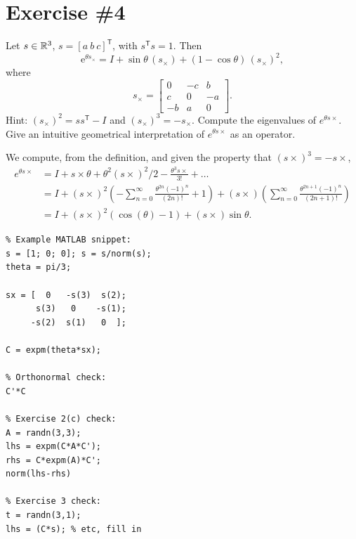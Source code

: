 \documentclass[11pt]{article}
\newcommand{\T}{\mathsf{T}}
\newcommand{\e}{\mathrm{e}}
\begin{document}
\section{Exercise \#4}
Let $s\in\mathbb{R}^3$, $s=[a\ b\ c]^\T$, with $s^\T s = 1$. Then
\[
\e^{\theta s_\times} = I + \sin\theta\,(s_\times) + (1-\cos\theta)\,(s_\times)^2,
\]
where
\[
s_\times =
\begin{bmatrix}
0 & -c & b\\
c & 0 & -a\\
-b & a & 0
\end{bmatrix}.
\]
Hint: $(s_\times)^2 = ss^\T - I$ and $(s_\times)^3 = -s_\times$.
Compute the eigenvalues of $e^{\theta s\times}$.
Give an intuitive geometrical interpretation of $e^{\theta s \times}$ as an operator.

We compute, from the definition, and given the property that $(s \times)^{3} = - s\times$,
\begin{align*}
    e^{\theta s\times} &= I  + s\times \theta + \theta^{2} (s\times)^2 / 2 - \frac{\theta^{3} s\times}{3!} + \ldots \\
    &= I + (s\times)^2 \left( - \sum_{n=0}^{\infty} \frac{\theta^{2n}(-1)^{n}}{(2n)!} + 1 \right) + (s\times) \left( \sum_{n=0}^{\infty} \frac{\theta^{2n + 1}(-1)^{n}}{(2n+1)!} \right)   \\
    &= I + (s\times)^2 (\cos(\theta) - 1) + (s\times) \sin\theta
.\end{align*}


\begin{verbatim}
% Example MATLAB snippet:
s = [1; 0; 0]; s = s/norm(s);
theta = pi/3;

sx = [  0   -s(3)  s(2);
      s(3)   0    -s(1);
     -s(2)  s(1)   0  ];

C = expm(theta*sx);

% Orthonormal check:
C'*C

% Exercise 2(c) check:
A = randn(3,3);
lhs = expm(C*A*C');
rhs = C*expm(A)*C';
norm(lhs-rhs)

% Exercise 3 check:
t = randn(3,1);
lhs = (C*s); % etc, fill in
\end{verbatim}
\end{document}
